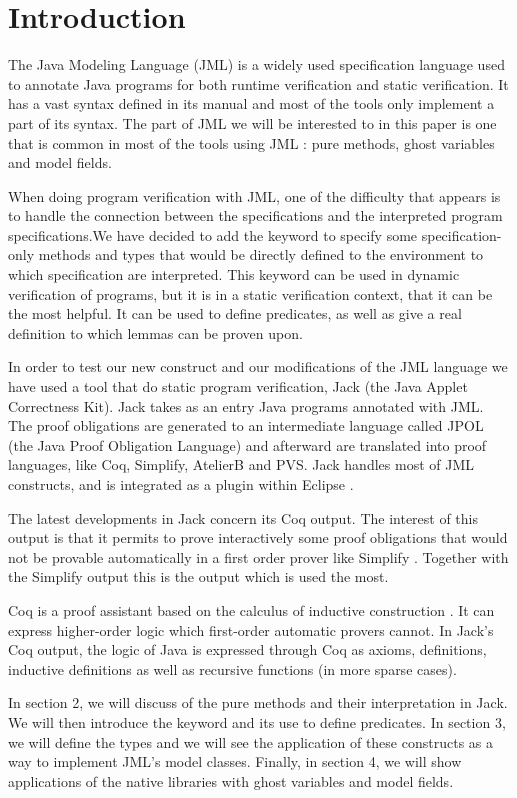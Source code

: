 
\section{Introduction}
The Java Modeling Language (JML) is a widely used specification language 
used to annotate Java programs for both runtime verification and static 
verification. It has a vast syntax defined in its manual and most of the 
tools only implement a part of its syntax. The part of JML we will be 
interested to in this paper is one that is common in most of the tools 
using JML \cite{BurdyEtAl05:STTT}: pure methods, ghost variables and  
model fields. 

When doing program verification with JML, one of the difficulty that appears
is to handle the connection between the specifications and the interpreted 
program specifications.We have decided to add the keyword 
to specify some specification-only methods and types that would be 
directly defined to the environment to which specification are interpreted. 
This keyword can be used in dynamic verification of programs, 
but it is in a static verification context, that it can be the most helpful.
It can be used to define predicates, as well as give a real definition 
to which lemmas can be proven upon.

In order to test our new construct and our modifications of the JML language 
we have used a tool that do static program verification,  Jack 
(the Java Applet Correctness Kit)\cite{BRL-03-JACK,Jack-Web}. 
Jack takes as an entry Java programs annotated with JML. 
The proof obligations are generated to an intermediate language called JPOL 
(the Java Proof Obligation Language) and afterward are translated into 
proof languages, like Coq, Simplify, AtelierB and PVS. 
Jack handles most of JML constructs, and is integrated as a plugin within 
Eclipse \cite{Eclipse-Web}.

The latest developments in Jack concern its Coq output. 
The interest of this output is that it permits to prove interactively some 
proof obligations that would not be provable automatically in a first order 
prover like Simplify \cite{simplify}.
Together with the Simplify output this is the output which is used the most.

Coq is a proof assistant based on the calculus of inductive construction 
\cite{BC-04-COQ}. 
It can express 
higher-order logic which first-order automatic provers cannot. In Jack's Coq 
output, the logic of Java is  expressed through Coq as axioms, definitions, 
inductive definitions as well as recursive 
functions (in more sparse cases).

In section 2,  we will discuss of the pure methods and their interpretation 
in Jack. We will then introduce
the  keyword and its use to define predicates.
In section 3, we will define the  types and we will see the 
application of these constructs 
as a way to implement JML's model classes.
Finally, in section 4, we will show applications of the native libraries with 
 ghost variables and model fields.
